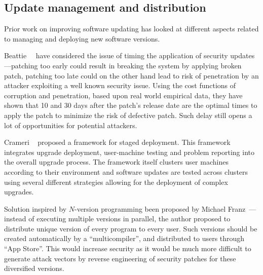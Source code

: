 \subsection{Update management and distribution}

Prior work on improving software updating has looked at different aspects
related to managing and deploying new software versions.

Beattie~\etal~\cite{beattie2002} have considered the issue of timing the application
of security updates---patching too early could result in breaking the system by
applying broken patch, patching too late could on the other hand lead to risk
of penetration by an attacker exploiting a well known security issue. Using the
cost functions of corruption and penetration, based upon real world empirical
data, they have shown that 10 and 30 days after the patch's release date are
the optimal times to apply the patch to minimize the risk of defective patch.
Such delay still opens a lot of opportunities for potential attackers.

Crameri \etal~\cite{crameri:updates} proposed a framework for staged
deployment. This framework integrates upgrade deployment, user-machine testing
and problem reporting into the overall upgrade process. The framework itself
clusters user machines according to their environment and software updates are
tested across clusters using several different strategies allowing for the
deployment of complex upgrades.

Solution inspired by $N$-version programming been proposed by Michael
Franz~\cite{unibus:nspw10}---instead of executing multiple versions in parallel,
the author proposed to distribute unique version of every program to every
user. Such versions should be created automatically by a ``multicompiler'',
and distributed to users through ``App Store''. This would increase security as
it would be much more difficult to generate attack vectors by reverse
engineering of security patches for these diversified versions.



